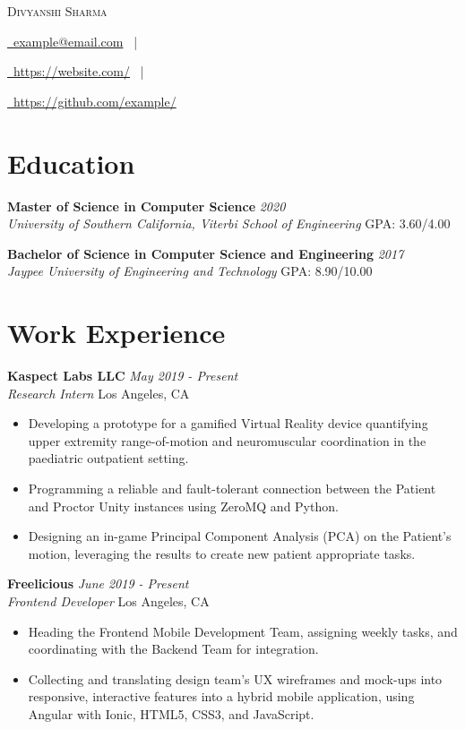 \documentclass[letterpaper,10pt]{article}
\makeatletter
\newcommand{\organization}[4]{
    \vspace{1.5pt}
    \textbf{#1} \hfill{\emph{#2}} \\
    \emph{#3} \hfill{#4} \\
    \vspace{3pt}
}
\newcommand{\bulletsBegin}{
    \vspace{1pt}
    \begin{minipage}{17.6cm} 
    \begin{itemize}[leftmargin=0.6cm]
    \setlength\itemsep{-0.009em}
}
\newcommand{\bulletsEnd}{
    \end{itemize}\vspace{0pt}
    \end{minipage}
}
\newcommand{\mySite}[1]{
    \href{https://example.com}{\faLink \ #1}
    \ |
}
\newcommand{\myEmail}[1]{
    \href{mailto:example@email.edu}{\faEnvelope \ #1}
    \ |
}
\newcommand{\myGitHub}[1]{
    \href{https://github.com/example/}{\faGithub \ #1}
}
\newcommand{\myName}[4]{
    \begin{center}
        {\huge{\color{burgundy}\scshape{#1}}} \\
        \vspace{6pt}
        \myEmail{#4}
        \mySite{#2}
        \myGitHub{#3}
    \end{center}
    \vspace{-4pt}
}
\makeatother
\begin{document}
    \myName{Divyanshi Sharma}{https://website.com/}{https://github.com/example/}{example@email.com}

    \section{Education}
        
    \organization{Master of Science in Computer Science}{2020}
        {University of Southern California, Viterbi School of Engineering}{GPA: 3.60/4.00}
        \vspace{5pt}

	\organization{Bachelor of Science in Computer Science and Engineering}{2017}
        {Jaypee University of Engineering and Technology}{GPA: 8.90/10.00}
        \vspace{5pt}

    \section{Work Experience}

        \organization{Kaspect Labs LLC}{May 2019 - Present}
        {Research Intern}{Los Angeles, CA}
        \bulletsBegin
            \item Developing a prototype for a gamified Virtual Reality device quantifying upper extremity range-of-motion and neuromuscular coordination in the paediatric outpatient setting. 
            \item Programming a reliable and fault-tolerant connection between the Patient and Proctor Unity instances using ZeroMQ and Python.
            \item Designing an in-game Principal Component Analysis (PCA) on the Patient's motion, leveraging the results to create new patient appropriate tasks.
        \bulletsEnd

        \organization{Freelicious}{June 2019 - Present}
        {Frontend Developer}{Los Angeles, CA}
        \bulletsBegin
            \item Heading the Frontend Mobile Development Team, assigning weekly tasks, and coordinating with the Backend Team for integration.
            \item Collecting and translating design team's UX wireframes and mock-ups into responsive, interactive features into a hybrid mobile application, using Angular with Ionic, HTML5, CSS3, and JavaScript.
        \bulletsEnd
\end{document}
